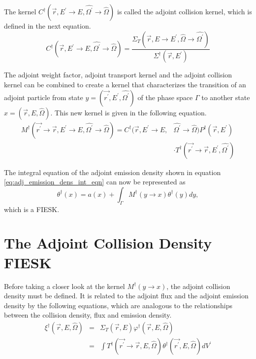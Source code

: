 The kernel $C^{\dagger}(\vec{r},E^{'} \to E,\hat{\Omega^{'}} \to \hat{\Omega})$ is
called the adjoint collision kernel, which is defined in the next equation.
\begin{equation}
  C^{\dagger}(\vec{r},E^{'} \to E,\hat{\Omega^{'}} \to \hat{\Omega}) = 
  \frac{\Sigma_T(\vec{r},E \to E^{'},\hat{\Omega} \to \hat{\Omega^{'}})}
       {\Sigma^{\dagger}(\vec{r},E^{'})}
  \label{eq:adj_collision_kernel}
\end{equation}

The adjoint weight factor, adjoint transport kernel and the adjoint collision
kernel can be combined to create a kernel that characterizes the transition of
an adjoint particle from state $y = (\vec{r^{'}},E^{'},\hat{\Omega^{'}})$ of the 
phase space $\Gamma$ to another state $x = (\vec{r},E,\hat{\Omega})$. This new 
kernel is given in the following equation.
\begin{equation}
  \begin{split}
    M^{\dagger}(\vec{r^{'}} \to \vec{r},E^{'} \to E,\hat{\Omega^{'}} \to \hat{\Omega})
    = C^{\dagger}(\vec{r},E^{'} \to E,&\hat{\Omega^{'}} \to \hat{\Omega})
    P^{\dagger}(\vec{r},E^{'}) \\
    & \cdot T^{\dagger}(\vec{r^{'}} \to \vec{r},E^{'},\hat{\Omega^{'}})
  \end{split}
  \label{eq:adj_emission_dens_kernel}
\end{equation}

The integral equation of the adjoint emission density shown in equation 
\ref{eq:adj_emission_dens_int_eqn} can now be represented as
\begin{equation*}
  \theta^{\dagger}(x) = a(x) + \int_{\Gamma}M^{\dagger}(y \to x) \theta^{\dagger}(y)dy,
\end{equation*}
which is a FIESK.

\section{The Adjoint Collision Density FIESK}
Before taking a closer look at the kernel $M^{\dagger}(y \to x)$, the adjoint
collision density must be defined. It is related to the adjoint flux and the
adjoint emission density by the following equations, which are analogous to
the relationships between the collision density, flux and emission density.
\begin{eqnarray}
  \xi^{\dagger}(\vec{r},E,\hat{\Omega}) & = & \Sigma_T(\vec{r},E)
  \varphi^{\dagger}(\vec{r},E,\hat{\Omega}) \\
  & = & \int T^{\dagger}(\vec{r^{'}} \to \vec{r},E,\hat{\Omega})
  \theta^{\dagger}(\vec{r^{'}},E,\hat{\Omega}) dV^{'}
  \label{eq:adj_collision_dens_to_adj_emission_dens}
\end{eqnarray}

